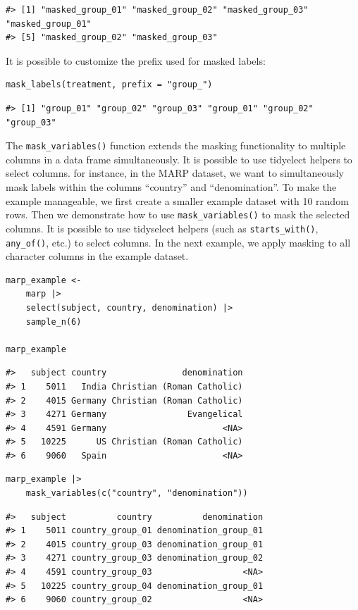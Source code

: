 \begin{verbatim}
#> [1] "masked_group_01" "masked_group_02" "masked_group_03" "masked_group_01"
#> [5] "masked_group_02" "masked_group_03"
\end{verbatim}

It is possible to customize the prefix used for masked labels:

\begin{verbatim}
mask_labels(treatment, prefix = "group_")
\end{verbatim}

\begin{verbatim}
#> [1] "group_01" "group_02" "group_03" "group_01" "group_02" "group_03"
\end{verbatim}

The \texttt{mask\_variables()} function extends the masking functionality to multiple columns in a data frame simultaneously. It is possible to use tidyelect helpers to select columns. for instance, in the MARP dataset, we want to simultaneously mask labels within the columns ``country'' and ``denomination''. To make the example manageable, we first create a smaller example dataset with 10 random rows. Then we demonstrate how to use \texttt{mask\_variables()} to mask the selected columns. It is possible to use tidyselect helpers (such as \texttt{starts\_with()}, \texttt{any\_of()}, etc.) to select columns. In the next example, we apply masking to all character columns in the example dataset.

\begin{verbatim}
marp_example <-
    marp |>
    select(subject, country, denomination) |> 
    sample_n(6)

marp_example
\end{verbatim}

\begin{verbatim}
#>   subject country               denomination
#> 1    5011   India Christian (Roman Catholic)
#> 2    4015 Germany Christian (Roman Catholic)
#> 3    4271 Germany                Evangelical
#> 4    4591 Germany                       <NA>
#> 5   10225      US Christian (Roman Catholic)
#> 6    9060   Spain                       <NA>
\end{verbatim}

\begin{verbatim}
marp_example |> 
    mask_variables(c("country", "denomination"))
\end{verbatim}

\begin{verbatim}
#>   subject          country          denomination
#> 1    5011 country_group_01 denomination_group_01
#> 2    4015 country_group_03 denomination_group_01
#> 3    4271 country_group_03 denomination_group_02
#> 4    4591 country_group_03                  <NA>
#> 5   10225 country_group_04 denomination_group_01
#> 6    9060 country_group_02                  <NA>
\end{verbatim}

